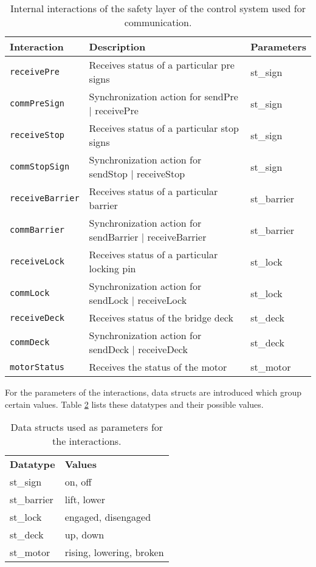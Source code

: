 %
\begin{table}[htb]%
\begin{tabular}{lll}
      \textbf{Interaction} &	\textbf{Description}	&	\textbf{Parameters}\\
      \hline
      \texttt{receivePre} & Receives status of a particular pre signs & st\_sign\\
      \texttt{commPreSign} & Synchronization action for sendPre $\mid$ receivePre & st\_sign\\
      
      \texttt{receiveStop} & Receives status of a particular stop signs & st\_sign\\
      \texttt{commStopSign} & Synchronization action for sendStop $\mid$ receiveStop & st\_sign\\
      
      \texttt{receiveBarrier} & Receives status of a particular barrier & st\_barrier\\
      \texttt{commBarrier} & Synchronization action for sendBarrier $\mid$ receiveBarrier & st\_barrier\\
      
      \texttt{receiveLock} & Receives status of a particular locking pin & st\_lock\\
      \texttt{commLock} & Synchronization action for sendLock $\mid$ receiveLock & st\_lock\\
      
      \texttt{receiveDeck} & Receives status of the bridge deck & st\_deck\\
      \texttt{commDeck} & Synchronization action for sendDeck $\mid$ receiveDeck & st\_deck\\
      
      \texttt{motorStatus} & Receives the status of the motor & st\_motor\\
\end{tabular}
\caption{Internal interactions of the safety layer of the control system used for communication.}
\label{tab:int}
\end{table}

For the parameters of the interactions, data structs are introduced which group certain values. Table \ref{tab:types} lists these datatypes and their possible values.

\begin{table}[htb]%
\begin{tabular}{ll}
	\textbf{Datatype} & \textbf{Values}\\
	st\_sign & on, off\\
	st\_barrier & lift, lower\\
	st\_lock & engaged, disengaged\\
	st\_deck & up, down\\
	st\_motor & rising, lowering, broken\\
\end{tabular}
\caption{Data structs used as parameters for the interactions.}
\label{tab:types}
\end{table}
%

\newpage